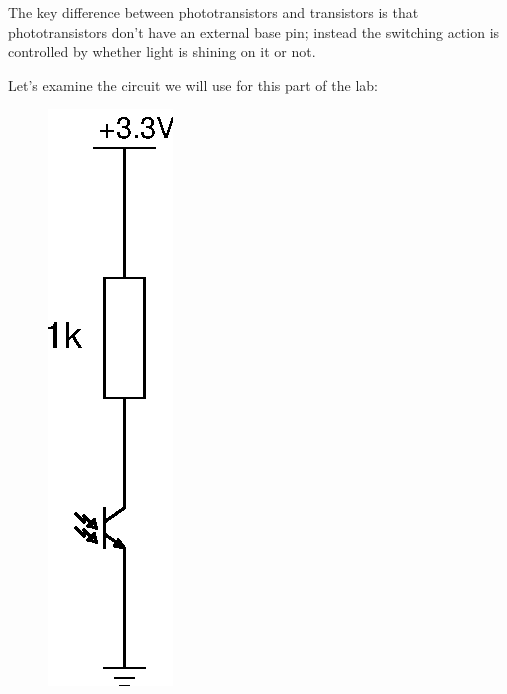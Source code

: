 \documentclass{article}
\begin{document}
The key difference between phototransistors and transistors is that
phototransistors don't have an external base pin; instead the switching action
is controlled by whether light is shining on it or not.

Let's examine the circuit we will use for this part of the lab:

\begin{figure}[h]
\centering
\includegraphics[width=.5\textwidth]{assets/fig/schem/ir-pt}
\end{figure}
\end{document}
